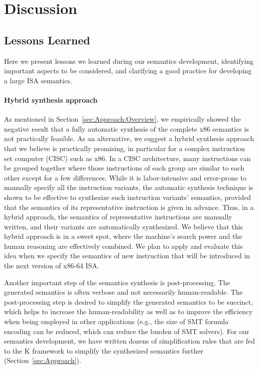 \section{Discussion}

\subsection{Lessons Learned}
\label{sec:lesson-learned}

Here we present lessons we learned during our semantics development, identifying important aspects to be considered, and clarifying a good practice for developing a large ISA semantics.

\paragraph{Hybrid synthesis approach}

As mentioned in Section~\ref{sec:Approach:Overview}, we empirically showed the negative result that a fully automatic synthesis of the complete x86 semantics is not practically feasible. As an alternative, we suggest a hybrid synthesis approach that we believe is practically promising, in particular for a complex instruction set computer (CISC) such as x86. In a CISC architecture, many instructions can be grouped together where those instructions of each group are similar to each other except for a few differences. While it is labor-intensive and error-prone to manually specify all the instruction variants, the automatic synthesis technique is shown to be effective to synthesize such instruction variants' semantics, provided that the semantics of its representative instruction is given in advance. Thus, in a hybrid approach, the semantics of representative instructions are manually written, and their variants are automatically synthesized. We believe that this hybrid approach is in a sweet spot, where the machine's search power and the human reasoning are effectively combined. We plan to apply and evaluate this idea when we specify the semantics of new instruction that will be introduced in the next version of x86-64 ISA.

Another important step of the semantics synthesis is post-processing. The generated semantics is often verbose and not necessarily human-readable. The post-processing step is desired to simplify the generated semantics to be succinct, which helps to increase the human-readability as well as to improve the efficiency when being employed in other applications (e.g., the size of SMT formula encoding can be reduced, which can reduce the burden of SMT solvers). For our semantics development, we have written dozens of simplification rules that are fed to the K framework to simplify the synthesized semantics further (Section~\ref{sec:Approach}).

